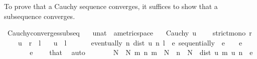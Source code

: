 \begin{isabellebody}
\isadelimproof
%
\endisadelimproof
%
\begin{isamarkuptext}%
To prove that a Cauchy sequence converges, it suffices to show that a subsequence converges.%
\end{isamarkuptext}\isamarkuptrue%
\isamarkupfalse%
\ Cauchy{\isacharunderscore}{\kern0pt}converges{\isacharunderscore}{\kern0pt}subseq{\isacharcolon}{\kern0pt}\isanewline
\ \ \ u{\isacharcolon}{\kern0pt}{\isacharcolon}{\kern0pt}{\isachardoublequoteopen}nat\ {\isasymRightarrow}\ {\isacharprime}{\kern0pt}a{\isacharcolon}{\kern0pt}{\isacharcolon}{\kern0pt}metric{\isacharunderscore}{\kern0pt}space{\isachardoublequoteclose}\isanewline
\ \ \ {\isachardoublequoteopen}Cauchy\ u{\isachardoublequoteclose}\isanewline
\ \ \ \ {\isachardoublequoteopen}strict{\isacharunderscore}{\kern0pt}mono\ r{\isachardoublequoteclose}\isanewline
\ \ \ \ {\isachardoublequoteopen}{\isacharparenleft}{\kern0pt}u\ {\isasymcirc}\ r{\isacharparenright}{\kern0pt}\ {\isasymlonglonglongrightarrow}\ l{\isachardoublequoteclose}\isanewline
\ \ \ {\isachardoublequoteopen}u\ {\isasymlonglonglongrightarrow}\ l{\isachardoublequoteclose}\isanewline
%
\isadelimproof
%
\endisadelimproof
%
\isatagproof
{}\isamarkupfalse%
\ {\isacharminus}{\kern0pt}\isanewline
\ \ \isamarkupfalse%
\ {\isacharasterisk}{\kern0pt}{\isacharcolon}{\kern0pt}\ {\isachardoublequoteopen}eventually\ {\isacharparenleft}{\kern0pt}{\isasymlambda}n{\isachardot}{\kern0pt}\ dist\ {\isacharparenleft}{\kern0pt}u\ n{\isacharparenright}{\kern0pt}\ l\ {\isacharless}{\kern0pt}\ e{\isacharparenright}{\kern0pt}\ sequentially{\isachardoublequoteclose}\ \ {\isachardoublequoteopen}e\ {\isachargreater}{\kern0pt}\ {}{\isachardoublequoteclose}\ \ e\isanewline
\ \ \isamarkupfalse%
\ {\isacharminus}{\kern0pt}\isanewline
\ \ \ \ \isamarkupfalse%
\ {\isachardoublequoteopen}e{\isacharslash}{\kern0pt}{}\ {\isachargreater}{\kern0pt}\ {}{\isachardoublequoteclose}\ \isamarkupfalse%
\ that\ \isamarkupfalse%
\ auto\isanewline
\ \ \ \ \isamarkupfalse%
\ \isamarkupfalse%
\ N{}\ \ N{}{\isacharcolon}{\kern0pt}\ {\isachardoublequoteopen}{\isasymAnd}m\ n{\isachardot}{\kern0pt}\ m\ {\isasymge}\ N{}\ {\isasymLongrightarrow}\ n\ {\isasymge}\ N{}\ {\isasymLongrightarrow}\ dist\ {\isacharparenleft}{\kern0pt}u\ m{\isacharparenright}{\kern0pt}\ {\isacharparenleft}{\kern0pt}u\ n{\isacharparenright}{\kern0pt}\ {\isacharless}{\kern0pt}\ e{\isacharslash}{\kern0pt}{}{\isachardoublequoteclose}\isanewline

\end{isabellebody}
